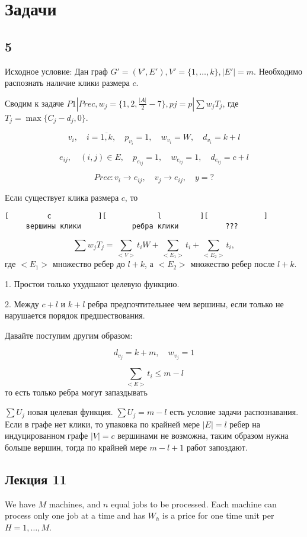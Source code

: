 \documentclass{amsart}
\begin{document}
\section{Задачи}

\subsection{5}

Исходное условие:
Дан граф $G'=(V',E'), V'=\{1,\dots,k\}, |E'|=m$.
Необходимо распознать наличие клики размера $c$.

Сводим к задаче
$P1 | Prec, w_j= \{ 1,2,\frac{|A|}{2}-7 \}, pj=p | \sum w_j T_j$,
где $T_j = \max \{C_j - d_j, 0\}$.

\[
  v_i, \quad i=\overline{1,k}, \quad p_{v_i} = 1, \quad
  w_{v_i} = W, \quad d_{v_i} = k + l
\]

\[
  e_{ij}, \quad (i,j) \in E, \quad p_{e_{ij}} = 1, \quad
  w_{e_{ij}} = 1, \quad d_{e_{ij}} = c + l
\]

\[
  Prec: v_i \to e_{ij}, \quad v_j \to e_{ij}, \quad
  y = ?
\]

Если существует клика размера $c$, то

\begin{verbatim}
[         c           ][            l         ][             ]
     вершины клики            ребра клики           ???
\end{verbatim}

\[
  \sum w_j T_j =
  \sum_{<V>} t_i W +
  \sum_{<E_1>} t_i + \sum_{<E_2>} t_i,
\]
где $<E_1>$ множество ребер до $l+k$, а $<E_2>$ множество ребер
после $l+k$.

1. Простои только ухудшают целевую функцию.

2. Между $c+l$ и $k+l$ ребра предпочтительнее чем вершины, если
только не нарушается порядок предшествования.

Давайте поступим другим образом:

\[
  d_{v_j} = k + m, \quad w_{v_j} = 1
\]

\[
  \sum_{<E>} t_i \leqslant m - l
\]
то есть только ребра могут запаздывать

$\sum U_j$ новая целевая функция.
$\sum U_j = m - l$ есть условие задачи распознавания.
Если в графе нет клики, то упаковка по крайней мере $|E|=l$ ребер
на индуцированном графе $|V|=c$ вершинами не возможна, таким образом
нужна больше вершин, тогда по крайней мере $m - l +1$
работ запоздают.

\subsection{Лекция 11}
We have $M$ machines, and $n$ equal jobs to be processed.
Each machine can process only one job at a time and has $W_h$ is a price
for one time unit per $H=1,\dots,M$.
\end{document}
